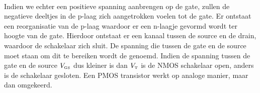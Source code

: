 \paragraph{}
Indien we echter een positieve spanning aanbrengen op de gate, zullen de negatieve deeltjes in de p-laag zich aangetrokken voelen tot de gate. Er ontstaat een reorganisatie van de p-laag waardoor er een n-laagje gevormd wordt ter hoogte van de gate. Hierdoor ontstaat er een kanaal tussen de source en de drain, waardoor de schakelaar zich sluit. De spanning die tussen de gate en de source moet staan om dit te bereiken wordt de  genoemd. Indien de spanning tussen de gate en de source $V_{\mbox{\tiny GS}}$ dus kleiner is dan $V_{\mbox{\tiny T}}$ is de NMOS schakelaar open, anders is de schakelaar gesloten. Een PMOS transistor werkt op analoge manier, maar dan omgekeerd.

